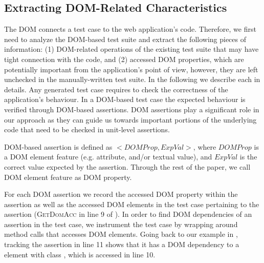 \subsection{Extracting DOM-Related Characteristics} \label{Sec:extractDomRelatedInfo}
The DOM connects a test case to the web application's \javascript code. Therefore, we first need to analyze the DOM-based test suite and extract the following pieces of information: (1) DOM-related operations of the existing test suite that may have tight connection with the \javascript code, and (2) accessed DOM properties, which are potentially important from the application's point of view, however, they are left unchecked in the manually-written test suite. In the following we describe each in details.
Any generated test case requires to check the correctness of the application's behaviour. In a DOM-based test case the expected behaviour is verified through DOM-based assertions. 
DOM assertions play a significant role in our approach as they can guide us towards important portions of the underlying \javascript code that need to be checked in unit-level assertions.

\begin{mydef}
\label{def:domAssertion}
DOM-based assertion is defined as $<DOMProp,ExpVal>$, where $DOMProp$ is a DOM element feature (e.g. attribute, and/or textual value), and $ExpVal$ is the correct value expected by the assertion. Through the rest of the paper, we call DOM element feature as DOM property.
\end{mydef}
For each DOM assertion we record the accessed DOM property within the assertion as well as the accessed DOM elements in the test case pertaining to the assertion (\textsc{GetDomAcc} in line 9 of ). 
In order to find DOM dependencies of an assertion in the test case, we instrument the test case by wrapping around method calls that accesses DOM elements.
Going back to our example in , tracking the assertion in line 11 shows that it has a DOM dependency to a  element with class , which is accessed in line 10.   
 
